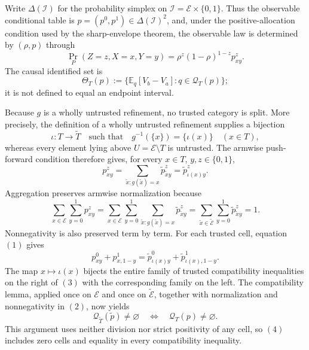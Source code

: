 Write \(\Delta(\mathcal I)\) for the probability simplex on \(\mathcal I=\mathcal E\times\{0,1\}\).  Thus the observable conditional table is \(p=(p^0,p^1)\in\Delta(\mathcal I)^2\), and, under the positive-allocation condition used by the sharp-envelope theorem, the observable law is determined by \((\rho,p)\) through
\[
 \Pr_P(Z=z,X=x,Y=y)=\rho^z(1-\rho)^{1-z}p^z_{xy}.
\]
The causal identified set is
\[
 \Theta_T(p):=\{\mathbb E_q[V_b-V_a]:q\in\mathcal Q_T(p)\};
\]
it is not defined to equal an endpoint interval.

Because \(g\) is a wholly untrusted refinement, no trusted category is split.  More precisely, the definition of a wholly untrusted refinement supplies a bijection
\[
 \iota:T\longrightarrow\widetilde T
 \quad\text{such that}\quad
 g^{-1}(\{x\})=\{\iota(x)\}\quad(x\in T),
\]
whereas every element lying above \(U=\mathcal E\setminus T\) is untrusted.  The armwise push-forward condition therefore gives, for every \(x\in T\), \(y,z\in\{0,1\}\),
\[
 p^z_{xy}
 =\sum_{\widetilde x:g(\widetilde x)=x}
       \widetilde p^z_{\widetilde x y}
 =\widetilde p^z_{\iota(x)y}.                                      \tag{1}
\]
Aggregation preserves armwise normalization because
\[
 \sum_{x\in\mathcal E}\sum_{y=0}^1p^z_{xy}
 =\sum_{x\in\mathcal E}\sum_{y=0}^1
   \sum_{\widetilde x:g(\widetilde x)=x}
       \widetilde p^z_{\widetilde x y}
 =\sum_{\widetilde x\in\widetilde{\mathcal E}}
   \sum_{y=0}^1\widetilde p^z_{\widetilde x y}=1.                 \tag{2}
\]
Nonnegativity is also preserved term by term.  For each trusted cell, equation \((1)\) gives
\[
 p^0_{xy}+p^1_{x,1-y}
 =\widetilde p^0_{\iota(x)y}
  +\widetilde p^1_{\iota(x),1-y}.                                \tag{3}
\]
The map \(x\mapsto\iota(x)\) bijects the entire family of trusted compatibility inequalities on the right of \((3)\) with the corresponding family on the left.  The compatibility lemma, applied once on \(\mathcal E\) and once on \(\widetilde{\mathcal E}\), together with normalization and nonnegativity in \((2)\), now yields
\[
 \mathcal Q_{\widetilde T}(\widetilde p)\ne\varnothing
 \quad\Longleftrightarrow\quad
 \mathcal Q_T(p)\ne\varnothing.                                  \tag{4}
\]
This argument uses neither division nor strict positivity of any cell, so \((4)\) includes zero cells and equality in every compatibility inequality.

